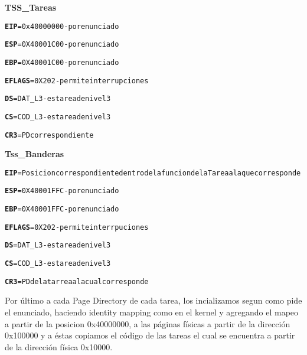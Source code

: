 \begin{itemize}
	\item \textbf{TSS\_Tareas}
	\begin{alltt}
		\item  \textbf{EIP} = 0x40000000  - por enunciado
		\item  \textbf{ESP} = 0X40001C00  - por enunciado
		\item  \textbf{EBP} = 0X40001C00  - por enunciado
		\item  \textbf{EFLAGS} = 0X202  - permite interrupciones
		
		\item  \textbf{DS} = DAT_L3  - es tarea de nivel 3
		\item  \textbf{CS} = COD_L3  - es tarea de nivel 3
		
		\item  \textbf{CR3} = PD correspondiente
		
	\end{alltt}
	
	\item \textbf{Tss\_Banderas}
	\begin{alltt}
		\item \textbf{EIP} = Posicion correspondiente dentro de la funcion de la Tarea a la que corresponde
		\item \textbf{ESP} = 0X40001FFC  - por enunciado
		\item \textbf{EBP} = 0X40001FFC  - por enunciado
		\item \textbf{EFLAGS} = 0X202  - permite interrpuciones
		
		\item \textbf{DS} = DAT_L3  - es tarea de nivel 3
		\item \textbf{CS} = COD_L3  - es tarea de nivel 3
		
		\item \textbf{CR3} = PD de la tarrea a la cual corresponde 
	\end{alltt}
\end{itemize}


\par{Por último a cada Page Directory de cada tarea, los incializamos segun como pide el enunciado, haciendo identity mapping como en el kernel y agregando el mapeo a partir de la posicion 0x40000000, a las páginas físicas a partir de la dirección 0x100000 y a éstas copiamos el código de las tareas el cual se encuentra a partir de la dirección física 0x10000.}